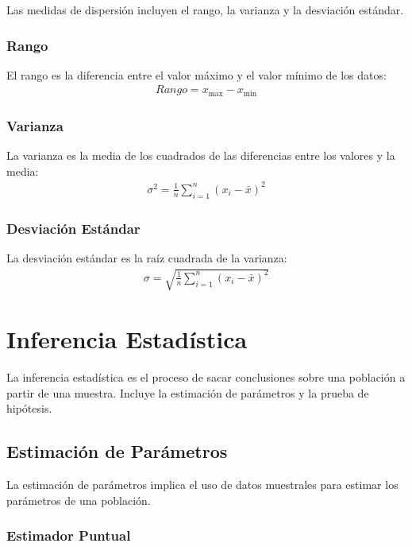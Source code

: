 Las medidas de dispersi\'on incluyen el rango, la varianza y la desviaci\'on est\'andar.

\subsubsection{Rango}

El rango es la diferencia entre el valor m\'aximo y el valor m\'inimo de los datos:
\begin{eqnarray*}
Rango = x_{\text{max}} - x_{\text{min}}
\end{eqnarray*}

\subsubsection{Varianza}

La varianza es la media de los cuadrados de las diferencias entre los valores y la media:
\begin{eqnarray*}
\sigma^2 = \frac{1}{n} \sum_{i=1}^{n} (x_i - \bar{x})^2
\end{eqnarray*}

\subsubsection{Desviaci\'on Est\'andar}

La desviaci\'on est\'andar es la ra\'iz cuadrada de la varianza:
\begin{eqnarray*}
\sigma = \sqrt{\frac{1}{n} \sum_{i=1}^{n} (x_i - \bar{x})^2}
\end{eqnarray*}

\section{Inferencia Estad\'istica}

La inferencia estad\'istica es el proceso de sacar conclusiones sobre una poblaci\'on a partir de una muestra. Incluye la estimaci\'on de par\'ametros y la prueba de hip\'otesis.

\subsection{Estimaci\'on de Par\'ametros}

La estimaci\'on de par\'ametros implica el uso de datos muestrales para estimar los par\'ametros de una poblaci\'on.

\subsubsection{Estimador Puntual}

